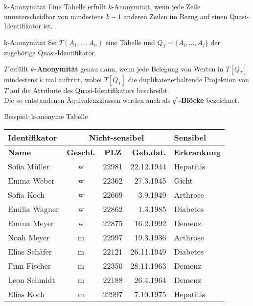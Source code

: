 \begin{frame}{k-Anonymität}
	Eine Tabelle erfüllt \(k\)-Anonymität, wenn jede Zeile ununterscheidbar von mindestens \(k-1\) anderen Zeilen im Bezug auf einen Quasi-Identifikator ist.

	\vspace{0.5cm}

	\begin{block}{k-Anonymität} Sei \(T(A_1, \dots , A_n)\) eine Tabelle und \(Q_T=\{A_i, \dots, A_j\}\) der zugehörige Quasi-Identifikator.
	\vspace{0.1cm}

	\(T\) erfüllt \textbf{\(k\)-Anonymität} genau dann, wenn jede Belegung von Werten in \(T[Q_T]\) mindestens \(k\) mal auftritt, wobei \(T[Q_T]\) die duplikatenerhaltende Projektion von \(T\) auf die Attribute des Quasi-Identifikators beschreibt.\\
	Die so entstandenen Äquivalenzklassen werden auch als \textbf{\(q^*\)-Blöcke} bezeichnet.
	\end{block}

\end{frame}

\begin{frame}{Beispiel: k-anonyme Tabelle}
	\begin{center}
		\begin{tabular}{|l|c|c|r|l|}
		\hline \textbf{Identifikator} & \multicolumn{3}{c|}{\textbf{Nicht-sensibel}} & \textbf{Sensibel} \\ 
		\hline \textbf{Name} & \textbf{Geschl.} & \textbf{PLZ} & \textbf{Geb.dat.} & \textbf{Erkrankung} \\
		\hline \hline Sofia Müller & w & 22981 & 22.12.1944 & Hepatitis \\ 
		\hline Emma Weber & w & 22362 & 27.3.1945 & Gicht \\
		\hline Sofia Koch & w & 22669 & 3.9.1949 & Arthrose \\ 
		\hline Emilia Wagner & w & 22862 & 1.3.1985 & Diabetes \\ 
		\hline Emma Meyer & w & 22875 & 16.2.1992 & Demenz \\  
		\hline Noah Meyer & m & 22997 & 19.3.1936 & Arthrose \\ 
		\hline Elias Schäfer & m & 22121 & 26.11.1949 & Diabetes \\ 
		\hline Finn Fischer & m & 22350 & 28.11.1963 & Demenz \\ 
		\hline Leon Schmidt & m & 22188 & 26.4.1964 & Demenz \\ 
		\hline Elias Koch & m & 22997 & 7.10.1975 & Hepatitis \\ 
		\hline 
		\end{tabular}
	\end{center}
\end{frame}


